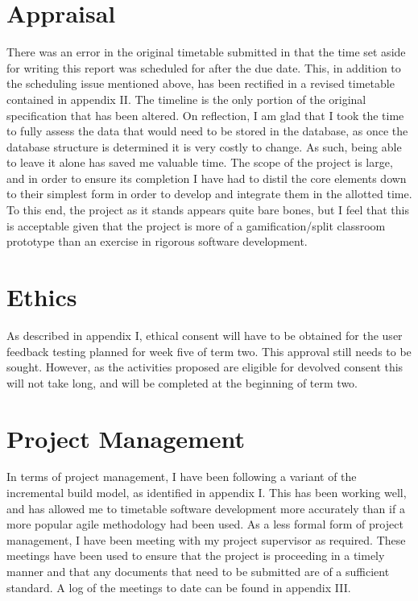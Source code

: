 \documentclass[10pt,a4paper]{report}
\begin{document}
\section*{Appraisal}
There was an error in the original timetable submitted in that the time set aside for writing this report was scheduled for after the due date. This, in addition to the scheduling issue mentioned above, has been rectified in a revised timetable contained in appendix II. The timeline is the only portion of the original specification that has been altered. On reflection, I am glad that I took the time to fully assess the data that would need to be stored in the database, as once the database structure is determined it is very costly to change. As such, being able to leave it alone has saved me valuable time. The scope of the project is large, and in order to ensure its completion I have had to distil the core elements down to their simplest form in order to develop and integrate them in the allotted time. To this end, the project as it stands appears quite bare bones, but I feel that this is acceptable given that the project is more of a gamification/split classroom prototype than an exercise in rigorous software development.

\section*{Ethics}
As described in appendix I, ethical consent will have to be obtained for the user feedback testing planned for week five of term two. This approval still needs to be sought. However, as the activities proposed are eligible for devolved consent this will not take long, and will be completed at the beginning of term two.

\section*{Project Management}
In terms of project management, I have been following a variant of the incremental build model, as identified in appendix I. This has been working well, and has allowed me to timetable software development more accurately than if a more popular agile methodology had been used. As a less formal form of project management, I have been meeting with my project supervisor as required. These meetings have been used to ensure that the project is proceeding in a timely manner and that any documents that need to be submitted are of a sufficient standard. A log of the meetings to date can be found in appendix III.
\end{document}
